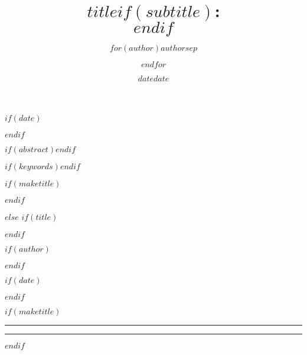 \documentclass[$if(fontsize)$$fontsize$,$endif$$if(lang)$$lang$,$endif$$if(papersize)$$papersize$,$endif$$for(classoption)$$classoption$$sep$,$endfor$]{$documentclass$}
\begin{document}



$if(date)$\date{$date$}$endif$

$if(abstract)$$endif$

$if(keywords)$$endif$

$if(maketitle)$
\maketitle
\flushbottom
$endif$

$else$
$if(title)$\title{$title$$if(subtitle)$:\\\vspace{0.5em}{\large $subtitle$}$endif$}$endif$

$if(author)$\author{$for(author)$$author$$sep$ \and $endfor$}$endif$

$if(date)$\date{$date$}$endif$

$if(maketitle)$
\thispagestyle{empty}

\noindent\rule{\textwidth}{2pt}

{\let\newpage\relax\maketitle}

\noindent\rule{\textwidth}{2pt}

\vspace{0.6cm}
$endif$
\end{document}
